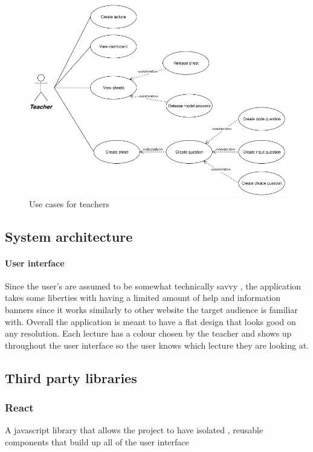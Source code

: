 \documentclass[12pt]{article}
\begin{document}
\begin{figure}[H]
  \centering

	\includegraphics[width=\textwidth,height=\textheight,keepaspectratio]{cases2}
	\caption{Use cases for teachers}
\end{figure}

\subsection{System architecture}
\paragraph{User interface}
Since the user's are assumed to be somewhat technically savvy , the application takes some liberties with having a limited amount of help and information banners since it works similarly to other website the target audience is familiar with.
Overall the application is meant to have a flat design that looks good on any resolution.
Each lecture has a colour chosen by the teacher and shows up throughout the user interface so the user knows which lecture they are looking at.

\subsection{Third party libraries}

\subsubsection{React}
A javascript library that allows the project to have isolated , reusable components that build up all of the user interface
\end{document}
